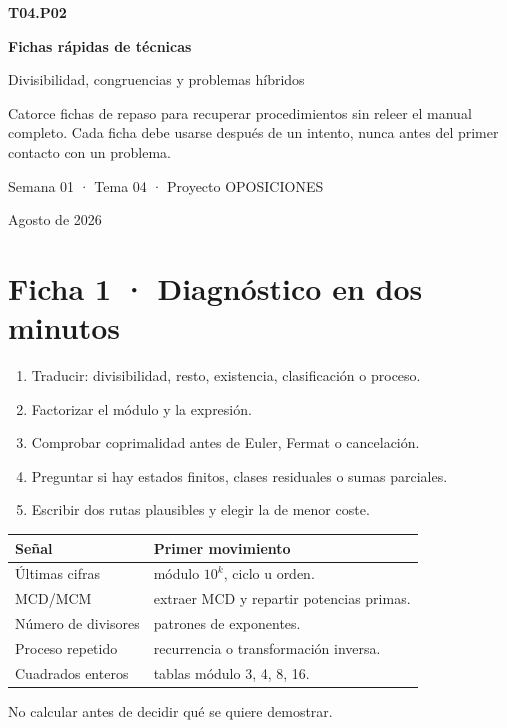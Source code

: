 \documentclass[10pt,a4paper,openany]{report}
\begin{document}
\begin{titlepage}
\centering\vspace*{2cm}
{\Huge\bfseries\color{navy}T04.P02\par}\vspace{.4cm}
{\LARGE\bfseries Fichas rápidas de técnicas\par}\vspace{.25cm}
{\Large Divisibilidad, congruencias y problemas híbridos\par}
\vfill
\begin{tcolorbox}[colback=lightblue,colframe=navy,width=.86\textwidth]
Catorce fichas de repaso para recuperar procedimientos sin releer el manual completo. Cada ficha debe usarse después de un intento, nunca antes del primer contacto con un problema.
\end{tcolorbox}
\vfill
{\large Semana 01 · Tema 04 · Proyecto OPOSICIONES\par}
{\small Agosto de 2026\par}
\end{titlepage}

\section*{Ficha 1 · Diagnóstico en dos minutos}
\begin{ruta}[· Secuencia]
\begin{enumerate}
\item Traducir: divisibilidad, resto, existencia, clasificación o proceso.
\item Factorizar el módulo y la expresión.
\item Comprobar coprimalidad antes de Euler, Fermat o cancelación.
\item Preguntar si hay estados finitos, clases residuales o sumas parciales.
\item Escribir dos rutas plausibles y elegir la de menor coste.
\end{enumerate}
\end{ruta}
\begin{tabularx}{\textwidth}{L{3.2cm}Y}
\toprule Señal & Primer movimiento\\\midrule
Últimas cifras & módulo $10^k$, ciclo u orden.\\
MCD/MCM & extraer MCD y repartir potencias primas.\\
Número de divisores & patrones de exponentes.\\
Proceso repetido & recurrencia o transformación inversa.\\
Cuadrados enteros & tablas módulo 3, 4, 8, 16.\\
\bottomrule
\end{tabularx}
\begin{alerta}No calcular antes de decidir qué se quiere demostrar.\end{alerta}
\clearpage
\end{document}
